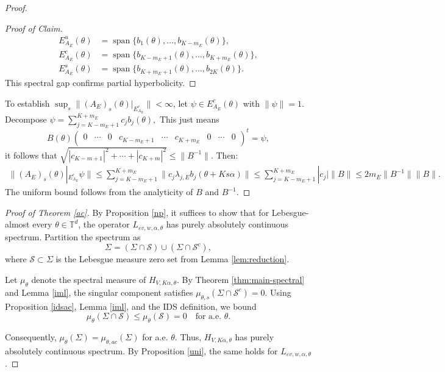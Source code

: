 \documentclass[11pt]{amsart}
\theoremstyle{remark}
\theoremstyle{definition}
\begin{document}
\begin{proof}
\begin{proof}[Proof of Claim]
        \[
        \begin{aligned}
            E_{A_E}^u(\theta) &= \operatorname{span}\{b_1(\theta), \ldots, b_{K-m_E}(\theta)\}, \\
            E_{A_E}^c(\theta) &= \operatorname{span}\{b_{K-m_E+1}(\theta), \ldots, b_{K+m_E}(\theta)\}, \\
            E_{A_E}^s(\theta) &= \operatorname{span}\{b_{K+m_E+1}(\theta), \ldots, b_{2K}(\theta)\}.
        \end{aligned}
        \]
        This spectral gap confirms partial hyperbolicity.
    \end{proof}

    To establish $\sup_s \|(A_E)_s(\theta)|_{E_{A_E}^c}\| < \infty$, let $\psi \in E_{A_E}^c(\theta)$ with $\|\psi\| = 1$. Decompose $\psi = \sum_{j=K-m_E+1}^{K+m_E} c_j b_j(\theta),$
    This just means  $$B(\theta)\begin{pmatrix}
    0&\cdots&0&c_{K-m_E+1}&\cdots &c_{K+m_E}&0&\cdots&0
\end{pmatrix}^t=\psi,$$ it follows that
$\sqrt{|c_{K-m+1}|^2+\cdots+|c_{K+m}|^2}\leq\|B^{-1}\|.$
    Then:
   \begin{eqnarray*}
	\|(A_E)_{s}(\theta)|_{E_{A_E}^c}\psi\| \leq \sum_{j=K-m_E+1}^{K+m_E}\|c_j \lambda_{j,E}b_j(\theta+Ks\alpha)\|\leq \sum_{j=K-m_E+1}^{K+m_E}|c_j| \|B\|
	\leq 2m_E\|B^{-1}\|\|B\|.
\end{eqnarray*}
    The uniform bound follows from the analyticity of $B$ and $B^{-1}$.
\end{proof}


\begin{proof}[Proof of Theorem \ref{ac}]
    By Proposition \ref{np}, it suffices to show that for Lebesgue-almost every $\theta \in \mathbb{T}^d$, the operator $L_{\varepsilon v,w,\alpha,\theta}$ has purely absolutely continuous spectrum. Partition the spectrum as
        \[
        \Sigma = (\Sigma \cap \mathcal{S}) \cup (\Sigma \cap \mathcal{S}^c),
        \]
        where $\mathcal{S} \subset \Sigma$ is the Lebesgue measure zero set from Lemma \ref{lem:reduction}.

      Let $\mu_\theta$ denote the spectral measure of $H_{V,K\alpha,\theta}$. By Theorem \ref{thm:main-spectral} and Lemma \ref{iml}, the singular component satisfies
    $ \mu_{\theta,s}(\Sigma \cap \mathcal{S}^c) = 0.$
        Using Proposition \ref{idsac}, Lemma \ref{iml}, and the IDS definition, we bound
        \[
        \mu_\theta(\Sigma \cap \mathcal{S}) \leq \mu_\theta(\mathcal{S}) = 0 \quad \text{for a.e. } \theta.
        \]

   Consequently, $\mu_\theta(\Sigma) = \mu_{\theta,ac}(\Sigma)$ for a.e. $\theta$. Thus, $H_{V,K\alpha,\theta}$ has purely absolutely continuous spectrum. By Proposition \ref{uni}, the same holds for $L_{\varepsilon v,w,\alpha,\theta}$. 
  
\end{proof}
\end{document}
